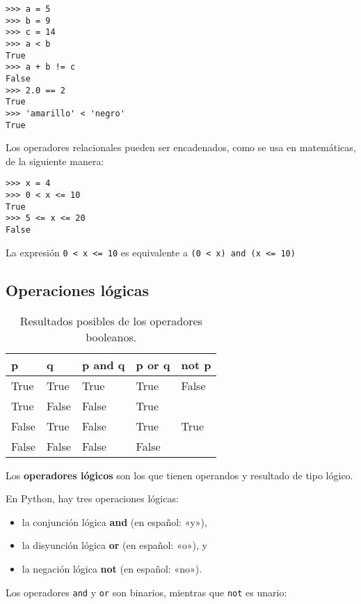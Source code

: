 \begin{lstlisting}
>>> a = 5
>>> b = 9
>>> c = 14
>>> a < b
True
>>> a + b != c
False
>>> 2.0 == 2
True
>>> 'amarillo' < 'negro'
True
\end{lstlisting}

Los operadores relacionales pueden ser encadenados, como se usa en
matemáticas, de la siguiente manera:

\begin{lstlisting}
>>> x = 4
>>> 0 < x <= 10
True
>>> 5 <= x <= 20
False
\end{lstlisting}

La expresión \lstinline!0 < x <= 10! es equivalente a
\lstinline!(0 < x) and (x <= 10)!

\subsection{Operaciones lógicas}

\begin{table}
  \centering
  \begin{tabular}{*{5}{l}}
    \toprule
    p     & q       & p and q & p or q & not p \\
    \midrule
    True  & True    & True    & True   & False \\
    True  & False   & False   & True   &       \\
    False & True    & False   & True   & True  \\
    False & False   & False   & False  &       \\
    \bottomrule
  \end{tabular}
  \caption{Resultados posibles de los operadores booleanos.}
  \label{tbl:operadores-booleanos}
\end{table}

Los \textbf{operadores lógicos} son los que tienen operandos y resultado
de tipo lógico.

En Python, hay tres operaciones lógicas:

\begin{itemize}
\item
  la conjunción lógica \textbf{and} (en español: «y»),
\item
  la disyunción lógica \textbf{or} (en español: «o»), y
\item
  la negación lógica \textbf{not} (en español: «no»).
\end{itemize}

Los operadores \lstinline!and! y \lstinline!or! son binarios, mientras
que \lstinline!not! es unario:

